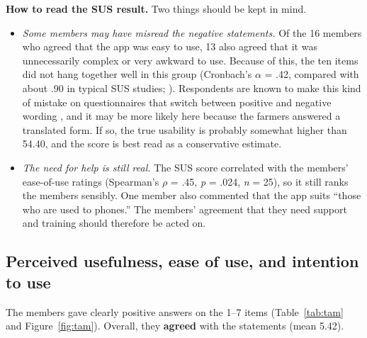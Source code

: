 \documentclass[11pt,a4paper]{article}
\begin{document}
\textbf{How to read the SUS result.} Two things should be kept in mind.
\begin{itemize}
  \item \textit{Some members may have misread the negative statements.} Of the 16 members who agreed that the app was easy to use, 13 also agreed that it was unnecessarily complex or very awkward to use. Because of this, the ten items did not hang together well in this group (Cronbach's $\alpha$ = .42, compared with about .90 in typical SUS studies; \citealt{bangor2008}). Respondents are known to make this kind of mistake on questionnaires that switch between positive and negative wording \citep{sauro2011}, and it may be more likely here because the farmers answered a translated form. If so, the true usability is probably somewhat higher than 54.40, and the score is best read as a conservative estimate.
  \item \textit{The need for help is still real.} The SUS score correlated with the members' ease-of-use ratings (Spearman's $\rho$ = .45, \textit{p} = .024, \textit{n} = 25), so it still ranks the members sensibly. One member also commented that the app suits ``those who are used to phones.'' The members' agreement that they need support and training should therefore be acted on.
\end{itemize}

\subsection{Perceived usefulness, ease of use, and intention to use}

The members gave clearly positive answers on the 1--7 items (Table~\ref{tab:tam} and Figure~\ref{fig:tam}). Overall, they \textbf{agreed} with the statements (mean 5.42).
\end{document}
